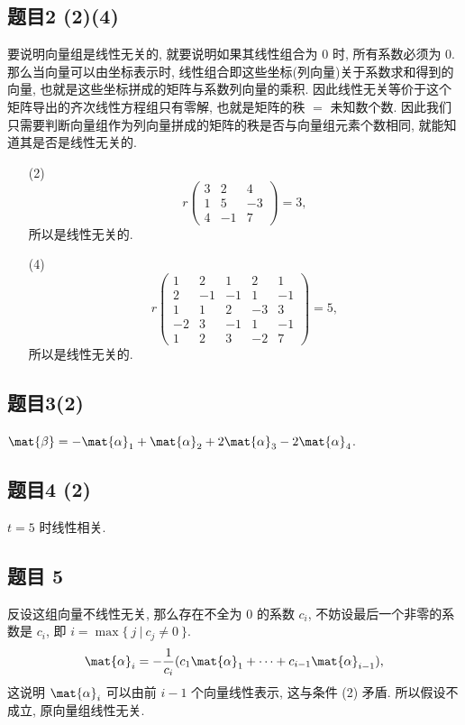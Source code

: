 \subsection*{ 题目2 (2)(4) }
\begin{solution}
要说明向量组是线性无关的, 就要说明如果其线性组合为 0 时, 所有系数必须为 0. 那么当向量可以由坐标表示时, 线性组合即这些坐标(列向量)关于系数求和得到的向量, 也就是这些坐标拼成的矩阵与系数列向量的乘积. 因此线性无关等价于这个矩阵导出的齐次线性方程组只有零解, 也就是矩阵的秩 $=$ 未知数个数. 因此我们只需要判断向量组作为列向量拼成的矩阵的秩是否与向量组元素个数相同, 就能知道其是否是线性无关的.
\begin{enumerate}
    \item[(2)]
    \[
        r\left(\begin{matrix}
            3 & 2 & 4 \\
            1 & 5 & -3 \\
            4 & -1 & 7
            \end{matrix}\right) = 3,
    \]
    所以是线性无关的.
    \item[(4)]
    \[
        r\left(\begin{matrix}
            1 & 2 & 1 & 2 & 1 \\
            2 & -1 & -1 & 1 & -1 \\
            1 & 1 & 2 & -3 & 3 \\
            -2 & 3 & -1 & 1 & -1 \\
            1 & 2 & 3 & -2 & 7
            \end{matrix}\right) = 5,
    \] 
    所以是线性无关的.
\end{enumerate}
\end{solution}

\subsection*{ 题目3(2) }
\begin{solution}
$\mat{\beta} = -\mat{\alpha}_1 + \mat{\alpha}_2 + 2\mat{\alpha}_3 - 2\mat{\alpha}_4$.
\end{solution}

\subsection*{ 题目4 (2) }
\begin{solution}
$t = 5$ 时线性相关.
\end{solution}

\newpage
\subsection*{ 题目 5 }
\begin{solution}
反设这组向量不线性无关, 那么存在不全为 $0$ 的系数 $c_i$, 不妨设最后一个非零的系数是 $ c_i$, 即 $i = \max\{ \ j \ | \ c_j \not= 0 \ \}$.
\[
\mat{\alpha}_i = -\frac{1}{c_i}(c_1 \mat{\alpha}_1 + \cdots + c_{i - 1} \mat{\alpha}_{i - 1}),
\]
这说明 $\mat{\alpha}_i$ 可以由前 $i - 1$ 个向量线性表示, 这与条件 (2) 矛盾. 所以假设不成立, 原向量组线性无关.
\end{solution}

